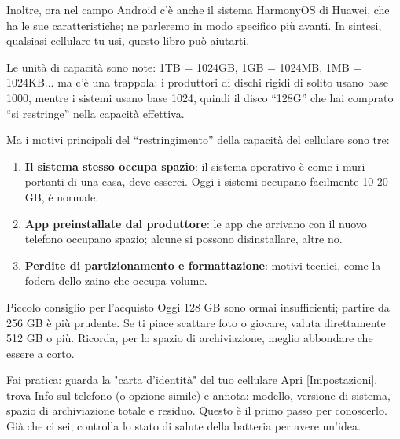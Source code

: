 Inoltre, ora nel campo Android c'è anche il sistema HarmonyOS di Huawei, che ha le sue caratteristiche; ne parleremo in modo specifico più avanti. In sintesi, qualsiasi cellulare tu usi, questo libro può aiutarti.


Le unità di capacità sono note: 1TB = 1024GB, 1GB = 1024MB, 1MB = 1024KB... ma c'è una trappola: i produttori di dischi rigidi di solito usano base 1000, mentre i sistemi usano base 1024, quindi il disco “128G” che hai comprato “si restringe” nella capacità effettiva.

Ma i motivi principali del “restringimento” della capacità del cellulare sono tre:

\begin{enumerate}
  \item \textbf{Il sistema stesso occupa spazio}: il sistema operativo è come i muri portanti di una casa, deve esserci. Oggi i sistemi occupano facilmente 10-20 GB, è normale.
  \item \textbf{App preinstallate dal produttore}: le app che arrivano con il nuovo telefono occupano spazio; alcune si possono disinstallare, altre no.
  \item \textbf{Perdite di partizionamento e formattazione}: motivi tecnici, come la fodera dello zaino che occupa volume.
\end{enumerate}

\begin{tcbinfo}{Piccolo consiglio per l'acquisto}
Oggi 128 GB sono ormai insufficienti; partire da 256 GB è più prudente. Se ti piace scattare foto o giocare, valuta direttamente 512 GB o più. Ricorda, per lo spazio di archiviazione, meglio abbondare che essere a corto.

\end{tcbinfo}

\begin{tcbpractice}{Fai pratica: guarda la "carta d'identità" del tuo cellulare}
Apri [Impostazioni], trova Info sul telefono (o opzione simile) e annota: modello, versione di sistema, spazio di archiviazione totale e residuo. Questo è il primo passo per conoscerlo. Già che ci sei, controlla lo stato di salute della batteria per avere un'idea.

\end{tcbpractice}


